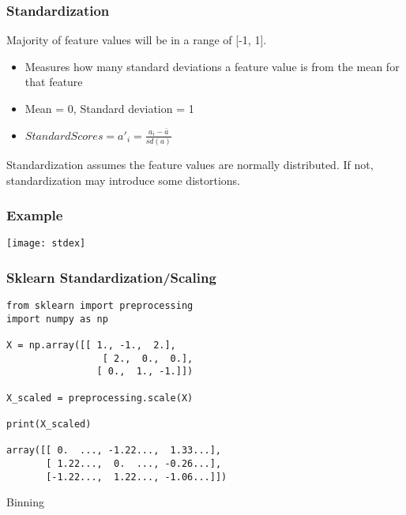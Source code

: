 \begin{frame}[fragile]\frametitle{Standardization}	
Majority of feature values will be in a range of [-1, 1].

\begin{itemize}
\item Measures how many standard deviations a feature value is from the mean for that feature
\item  Mean = 0, Standard deviation = 1 
\item  $Standard Scores = a'_i = \frac{a_i - \bar{a}}{sd(a)}$
\end{itemize}
Standardization assumes the feature values are normally distributed. If not, standardization may introduce some distortions.

\end{frame}


\begin{frame}[fragile]\frametitle{Example}	
\begin{center}
\texttt{[image: stdex]}
\end{center}
\end{frame}

\begin{frame}[fragile]\frametitle{Sklearn Standardization/Scaling}
\begin{lstlisting}
from sklearn import preprocessing
import numpy as np

X = np.array([[ 1., -1.,  2.],
				 [ 2.,  0.,  0.],
				[ 0.,  1., -1.]])
				
X_scaled = preprocessing.scale(X)

print(X_scaled)

array([[ 0.  ..., -1.22...,  1.33...],
       [ 1.22...,  0.  ..., -0.26...],
       [-1.22...,  1.22..., -1.06...]])
\end{lstlisting}
\end{frame}


\begin{frame}
  \begin{center}
    {\Large Binning}
  \end{center}
\end{frame}


